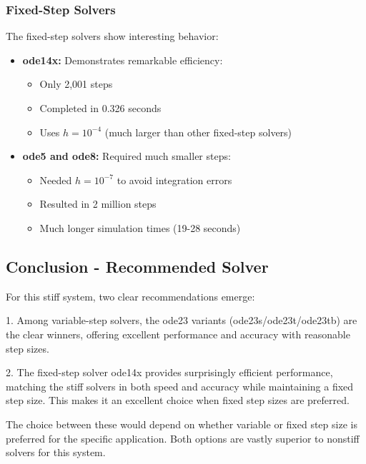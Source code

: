 \subsubsection*{Fixed-Step Solvers}
The fixed-step solvers show interesting behavior:

\begin{itemize}
    \item \textbf{ode14x:} Demonstrates remarkable efficiency:
    \begin{itemize}
        \item Only 2,001 steps
        \item Completed in 0.326 seconds
        \item Uses $h = 10^{-4}$ (much larger than other fixed-step solvers)
    \end{itemize}
    
    \item \textbf{ode5 and ode8:} Required much smaller steps:
    \begin{itemize}
        \item Needed $h = 10^{-7}$ to avoid integration errors
        \item Resulted in 2 million steps
        \item Much longer simulation times (19-28 seconds)
    \end{itemize}
\end{itemize}

\subsection*{Conclusion - Recommended Solver}   
For this stiff system, two clear recommendations emerge:

1. Among variable-step solvers, the ode23 variants (ode23s/ode23t/ode23tb) are the clear winners, offering excellent performance and accuracy with reasonable step sizes.

2. The fixed-step solver ode14x provides surprisingly efficient performance, matching the stiff solvers in both speed and accuracy while maintaining a fixed step size. This makes it an excellent choice when fixed step sizes are preferred.

The choice between these would depend on whether variable or fixed step size is preferred for the specific application. Both options are vastly superior to nonstiff solvers for this system.



